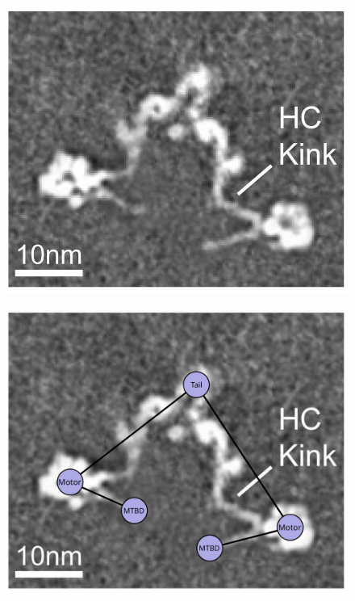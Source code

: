 \documentclass[9pt,twocolumn,twoside,lineno]{pnas-new}
\begin{document}
\begin{figure}%
\centering
 \begin{minipage}{.3\textwidth}
   \centering
   \includegraphics[width=\linewidth]{figures/schematic-1-cryoem}
   \label{fig:modlengths}
 \end{minipage}%
 \begin{minipage}{.3\textwidth}
   \centering
   \includegraphics[width=\linewidth]{figures/schematic-1-superimposed}
   \label{fig:modlengths}
 \end{minipage}%

\end{figure}
\end{document}

